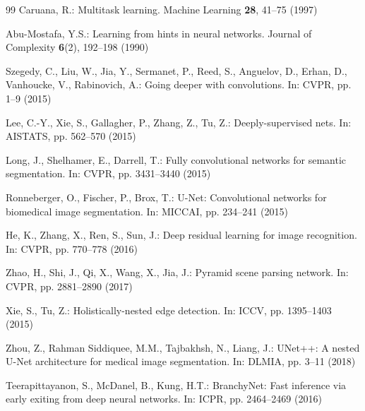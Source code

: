 \documentclass{article}
\begin{document}
%
\begin{thebibliography}{99}
Caruana, R.: Multitask learning. Machine Learning \textbf{28}, 41--75 (1997)

Abu-Mostafa, Y.S.: Learning from hints in neural networks. Journal of
Complexity \textbf{6}(2), 192--198 (1990)

Szegedy, C., Liu, W., Jia, Y., Sermanet, P., Reed, S., Anguelov, D., Erhan, D.,
Vanhoucke, V., Rabinovich, A.: Going deeper with convolutions. In: CVPR,
pp. 1--9 (2015)

Lee, C.-Y., Xie, S., Gallagher, P., Zhang, Z., Tu, Z.: Deeply-supervised nets.
In: AISTATS, pp. 562--570 (2015)

Long, J., Shelhamer, E., Darrell, T.: Fully convolutional networks for semantic
segmentation. In: CVPR, pp. 3431--3440 (2015)

Ronneberger, O., Fischer, P., Brox, T.: U-Net: Convolutional networks for
biomedical image segmentation. In: MICCAI, pp. 234--241 (2015)

He, K., Zhang, X., Ren, S., Sun, J.: Deep residual learning for image
recognition. In: CVPR, pp. 770--778 (2016)

Zhao, H., Shi, J., Qi, X., Wang, X., Jia, J.: Pyramid scene parsing network.
In: CVPR, pp. 2881--2890 (2017)

Xie, S., Tu, Z.: Holistically-nested edge detection. In: ICCV,
pp. 1395--1403 (2015)

Zhou, Z., Rahman Siddiquee, M.M., Tajbakhsh, N., Liang, J.: UNet++: A nested
U-Net architecture for medical image segmentation. In: DLMIA, pp. 3--11 (2018)

Teerapittayanon, S., McDanel, B., Kung, H.T.: BranchyNet: Fast inference via
early exiting from deep neural networks. In: ICPR, pp. 2464--2469 (2016)
\end{thebibliography}
\end{document}
